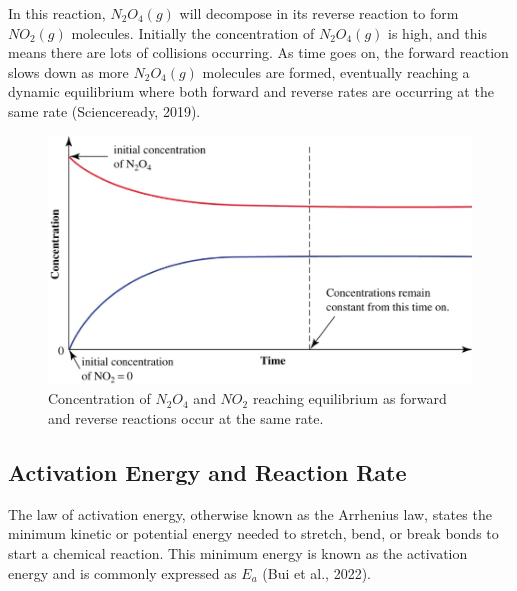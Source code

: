 In this reaction, \begin{math}N_{2}O_{4}(g)\end{math} will decompose in its reverse reaction to form \begin{math}NO_{2}(g)\end{math} molecules. Initially the concentration of \begin{math}N_{2}O_{4}(g)\end{math} is high, and this means there are lots of collisions occurring. As time goes on, the forward reaction slows down as more \begin{math}N_{2}O_{4}(g)\end{math} molecules are formed, eventually reaching a dynamic equilibrium where both forward and reverse rates are occurring at the same rate (Scienceready, 2019).

\begin{figure}
    \centering
    \includegraphics[width=1\linewidth]{assets/2.jpg}
    \caption{Concentration of \begin{math}N_{2}O_{4}\end{math} and \begin{math} NO_{2}\end{math} reaching equilibrium as forward and reverse reactions occur at the same rate.}
    \label{fig:enter-label}
\end{figure}
\newpage

\subsection{Activation Energy and Reaction Rate}
The law of activation energy, otherwise known as the Arrhenius law, states the minimum kinetic or potential energy needed to stretch, bend, or break bonds to start a chemical reaction. This minimum energy is known as the activation energy and is commonly expressed as \begin{math}E_{a}\end{math} (Bui et al., 2022). \newpage

